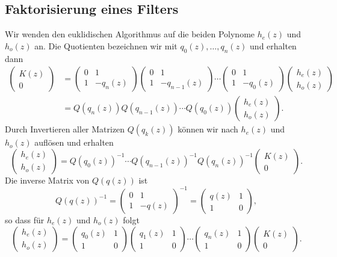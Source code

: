 \subsection{Faktorisierung eines Filters}
Wir wenden den euklidischen Algorithmus auf die beiden Polynome $h_e(z)$
und $h_o(z)$ an.
Die Quotienten bezeichnen wir mit $q_0(z),\dots,q_n(z)$ und erhalten dann
\begin{align*}
\begin{pmatrix} K(z) \\ 0 \end{pmatrix}
&=
\begin{pmatrix} 0&1\\ 1&-q_n(z) \end{pmatrix}
\begin{pmatrix} 0&1\\ 1&-q_{n-1}(z) \end{pmatrix}
\cdots
\begin{pmatrix} 0&1\\ 1&-q_0(z) \end{pmatrix}
\begin{pmatrix} h_e(z)\\h_o(z)\end{pmatrix}
\\
&=
Q(q_n(z))
Q(q_{n-1}(z))
\cdots
Q(q_0(z))
\begin{pmatrix} h_e(z)\\h_o(z)\end{pmatrix}.
\end{align*}
Durch Invertieren aller Matrizen $Q(q_k(z))$ können wir nach $h_e(z)$
und $h_o(z)$ auflösen und erhalten
\[
\begin{pmatrix} h_e(z)\\h_o(z)\end{pmatrix}
=
Q(q_0(z))^{-1}
\cdots
Q(q_{n-1}(z))^{-1}
Q(q_n(z))^{-1}
\begin{pmatrix}K(z)\\0\end{pmatrix}.
\]
Die inverse Matrix von $Q(q(z))$ ist
\[
Q(q(z))^{-1}
= 
\begin{pmatrix}
0&1\\
1&-q(z)
\end{pmatrix}^{-1}
=
\begin{pmatrix}
q(z)&1\\
1&0
\end{pmatrix},
\]
so dass für $h_e(z)$ und $h_o(z)$ folgt
\[
\begin{pmatrix} h_e(z)\\h_o(z)\end{pmatrix}
=
\begin{pmatrix} q_0(z)&1\\1&0 \end{pmatrix}
\begin{pmatrix} q_1(z)&1\\1&0 \end{pmatrix}
\cdots
\begin{pmatrix} q_n(z)&1\\1&0 \end{pmatrix}
\begin{pmatrix} K(z) \\ 0 \end{pmatrix}.
\]

